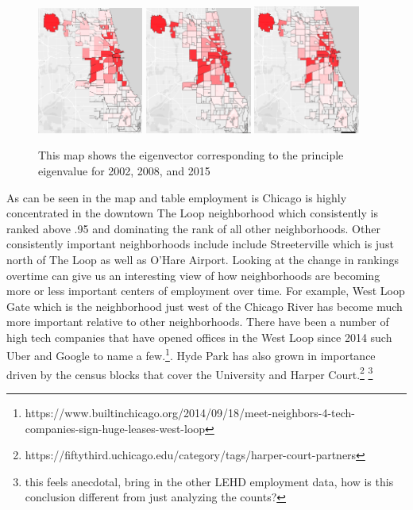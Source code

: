 \documentclass{article}
\theoremstyle{definition}
\theoremstyle{remark}
\begin{document}
\begin{figure}[H]
    \centering
    \includegraphics[width=0.31\textwidth]{Jobs-S000-2002}
    \includegraphics[width=0.31\textwidth]{Jobs-S000-2008}
    \includegraphics[width=0.31\textwidth]{Jobs-S000-2015}
    \caption{This map shows the eigenvector corresponding to the principle eigenvalue for 2002, 2008, and 2015}
    \label{fig:Jobs-S000-2008}
\end{figure}

As can be seen in the map and table employment is Chicago is highly concentrated in the downtown The Loop neighborhood which consistently is ranked above .95 and dominating the rank of all other neighborhoods.  Other consistently important neighborhoods include include Streeterville which is just north of The Loop as well as O'Hare Airport. Looking at the change in rankings overtime can give us an interesting view of how neighborhoods are becoming more or less important centers of employment over time.  For example, West Loop Gate which is the neighborhood just west of the Chicago River has become much more important relative to other neighborhoods.  There have been a number of high tech companies that have opened offices in the West Loop since 2014 such Uber and Google to name a few.\footnote{https://www.builtinchicago.org/2014/09/18/meet-neighbors-4-tech-companies-sign-huge-leases-west-loop}.  Hyde Park has also grown in importance driven by the census blocks that cover the University and Harper Court.\footnote{https://fiftythird.uchicago.edu/category/tags/harper-court-partners} \footnote{this feels anecdotal, bring in the other LEHD employment data, how is this conclusion different from just analyzing the counts?}\\
\end{document}
